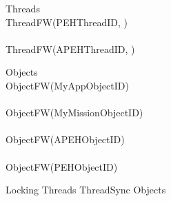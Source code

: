 %
\begin{circus}
\circprocess Threads \circdef  \\
\circblockopen
ThreadFW(PEHThreadID, ) \\
\interleave \\
ThreadFW(APEHThreadID, ) \\

\circblockclose
\end{circus}
%
%
\begin{circus}
\circprocess Objects \circdef \\
\circblockopen
ObjectFW(MyAppObjectID) \\
\interleave \\
ObjectFW(MyMissionObjectID) \\
\interleave \\
ObjectFW(APEHObjectID) \\
\interleave \\
ObjectFW(PEHObjectID) \\

\circblockclose
\end{circus}
%
%
\begin{circus}
\circprocess Locking \circdef Threads \lpar ThreadSync \rpar Objects
\end{circus}
